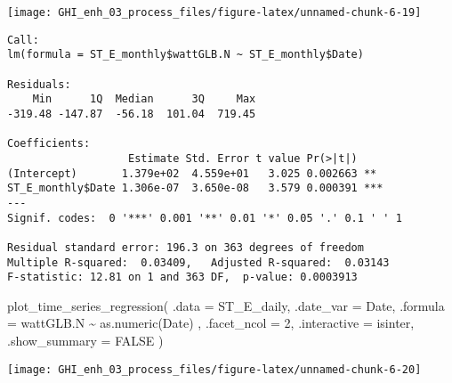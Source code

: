\documentclass[
  10pt,
  a4paper,oneside]{article}
\newenvironment{Shaded}{\begin{snugshade}}{\end{snugshade}}
\newcommand{\AttributeTok}[1]{\textcolor[rgb]{0.77,0.63,0.00}{#1}}
\newcommand{\ConstantTok}[1]{\textcolor[rgb]{0.00,0.00,0.00}{#1}}
\newcommand{\DecValTok}[1]{\textcolor[rgb]{0.00,0.00,0.81}{#1}}
\newcommand{\FunctionTok}[1]{\textcolor[rgb]{0.00,0.00,0.00}{#1}}
\newcommand{\NormalTok}[1]{#1}
\newcommand{\OtherTok}[1]{\textcolor[rgb]{0.56,0.35,0.01}{#1}}
\newcommand{\SpecialCharTok}[1]{\textcolor[rgb]{0.00,0.00,0.00}{#1}}
\begin{document}
\begin{center}\texttt{[image: GHI\_enh\_03\_process\_files/figure-latex/unnamed-chunk-6-19]} \end{center}

\begin{Shaded}
\end{Shaded}

\begin{verbatim}
Call:
lm(formula = ST_E_monthly$wattGLB.N ~ ST_E_monthly$Date)

Residuals:
    Min      1Q  Median      3Q     Max 
-319.48 -147.87  -56.18  101.04  719.45 

Coefficients:
                   Estimate Std. Error t value Pr(>|t|)    
(Intercept)       1.379e+02  4.559e+01   3.025 0.002663 ** 
ST_E_monthly$Date 1.306e-07  3.650e-08   3.579 0.000391 ***
---
Signif. codes:  0 '***' 0.001 '**' 0.01 '*' 0.05 '.' 0.1 ' ' 1

Residual standard error: 196.3 on 363 degrees of freedom
Multiple R-squared:  0.03409,   Adjusted R-squared:  0.03143 
F-statistic: 12.81 on 1 and 363 DF,  p-value: 0.0003913
\end{verbatim}

\begin{Shaded}
\begin{Highlighting}[]
\FunctionTok{plot\_time\_series\_regression}\NormalTok{(}
    \AttributeTok{.data         =}\NormalTok{ ST\_E\_daily,}
    \AttributeTok{.date\_var     =}\NormalTok{ Date,}
    \AttributeTok{.formula      =}\NormalTok{ wattGLB.N }\SpecialCharTok{\textasciitilde{}} \FunctionTok{as.numeric}\NormalTok{(Date)  ,}
    \AttributeTok{.facet\_ncol   =} \DecValTok{2}\NormalTok{,}
    \AttributeTok{.interactive  =}\NormalTok{ isinter,}
    \AttributeTok{.show\_summary =} \ConstantTok{FALSE}
\NormalTok{)}
\end{Highlighting}
\end{Shaded}

\begin{center}\texttt{[image: GHI\_enh\_03\_process\_files/figure-latex/unnamed-chunk-6-20]} \end{center}
\end{document}
